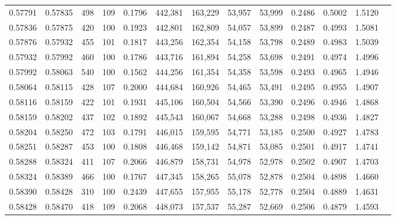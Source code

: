 \begin{tabular}{rrrrrrrrrrrrr}
0.57791 & 0.57835 &   498 & 109 &                                     0.1796 & 442,381 & 163,229 &  53,957 &  53,999 & 0.2486 & 0.5002 & 1.5120 \\
0.57836 & 0.57875 &   420 & 100 &                                     0.1923 & 442,801 & 162,809 &  54,057 &  53,899 & 0.2487 & 0.4993 & 1.5081 \\
0.57876 & 0.57932 &   455 & 101 &                                     0.1817 & 443,256 & 162,354 &  54,158 &  53,798 & 0.2489 & 0.4983 & 1.5039 \\
0.57932 & 0.57992 &   460 & 100 &                                     0.1786 & 443,716 & 161,894 &  54,258 &  53,698 & 0.2491 & 0.4974 & 1.4996 \\
0.57992 & 0.58063 &   540 & 100 &                                     0.1562 & 444,256 & 161,354 &  54,358 &  53,598 & 0.2493 & 0.4965 & 1.4946 \\
0.58064 & 0.58115 &   428 & 107 &                                     0.2000 & 444,684 & 160,926 &  54,465 &  53,491 & 0.2495 & 0.4955 & 1.4907 \\
0.58116 & 0.58159 &   422 & 101 &                                     0.1931 & 445,106 & 160,504 &  54,566 &  53,390 & 0.2496 & 0.4946 & 1.4868 \\
0.58159 & 0.58202 &   437 & 102 &                                     0.1892 & 445,543 & 160,067 &  54,668 &  53,288 & 0.2498 & 0.4936 & 1.4827 \\
0.58204 & 0.58250 &   472 & 103 &                                     0.1791 & 446,015 & 159,595 &  54,771 &  53,185 & 0.2500 & 0.4927 & 1.4783 \\
0.58251 & 0.58287 &   453 & 100 &                                     0.1808 & 446,468 & 159,142 &  54,871 &  53,085 & 0.2501 & 0.4917 & 1.4741 \\
0.58288 & 0.58324 &   411 & 107 &                                     0.2066 & 446,879 & 158,731 &  54,978 &  52,978 & 0.2502 & 0.4907 & 1.4703 \\
0.58324 & 0.58389 &   466 & 100 &                                     0.1767 & 447,345 & 158,265 &  55,078 &  52,878 & 0.2504 & 0.4898 & 1.4660 \\
0.58390 & 0.58428 &   310 & 100 &                                     0.2439 & 447,655 & 157,955 &  55,178 &  52,778 & 0.2504 & 0.4889 & 1.4631 \\
0.58428 & 0.58470 &   418 & 109 &                                     0.2068 & 448,073 & 157,537 &  55,287 &  52,669 & 0.2506 & 0.4879 & 1.4593 \\

\end{tabular}
